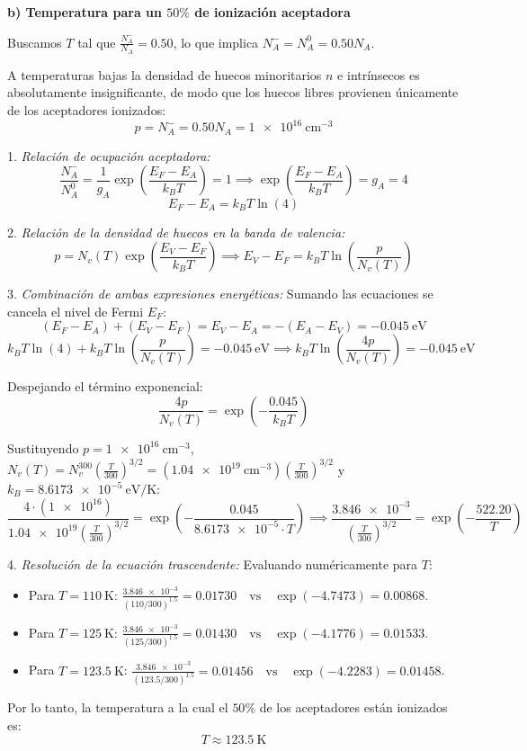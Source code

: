\begin{problema}
\textbf{b) Temperatura para un $50\%$ de ionización aceptadora}

Buscamos $T$ tal que $\frac{N_A^-}{N_A} = 0.50$, lo que implica $N_A^- = N_A^0 = 0.50 N_A$.

A temperaturas bajas la densidad de huecos minoritarios $n$ e intrínsecos es absolutamente insignificante, de modo que los huecos libres provienen únicamente de los aceptadores ionizados:
\[
p = N_A^- = 0.50 N_A = \SI{1e16}{\cm^{-3}}
\]

1. \textit{Relación de ocupación aceptadora:}
\[
\frac{N_A^-}{N_A^0} = \frac{1}{g_A} \exp\left( \frac{E_F - E_A}{k_B T} \right) = 1 \implies \exp\left( \frac{E_F - E_A}{k_B T} \right) = g_A = 4
\]
\[
E_F - E_A = k_B T \ln(4)
\]

2. \textit{Relación de la densidad de huecos en la banda de valencia:}
\[
p = N_v(T) \exp\left( \frac{E_V - E_F}{k_B T} \right) \implies E_V - E_F = k_B T \ln\left( \frac{p}{N_v(T)} \right)
\]

3. \textit{Combinación de ambas expresiones energéticas:}
Sumando las ecuaciones se cancela el nivel de Fermi $E_F$:
\[
(E_F - E_A) + (E_V - E_F) = E_V - E_A = -(E_A - E_V) = -\SI{0.045}{\eV}
\]
\[
k_B T \ln(4) + k_B T \ln\left( \frac{p}{N_v(T)} \right) = -\SI{0.045}{\eV} \implies k_B T \ln\left( \frac{4 p}{N_v(T)} \right) = -\SI{0.045}{\eV}
\]

Despejando el término exponencial:
\[
\frac{4 p}{N_v(T)} = \exp\left( -\frac{0.045}{k_B T} \right)
\]

Sustituyendo $p = \SI{1e16}{\cm^{-3}}$, $N_v(T) = N_v^{300} \left(\frac{T}{300}\right)^{3/2} = (\SI{1.04e19}{\cm^{-3}}) \left(\frac{T}{300}\right)^{3/2}$ y $k_B = \SI{8.6173e-5}{\eV/\kelvin}$:
\[
\frac{4 \cdot (\num{1e16})}{\num{1.04e19} \left( \frac{T}{300} \right)^{3/2}} = \exp\left( -\frac{0.045}{\num{8.6173e-5} \cdot T} \right) \implies \frac{\num{3.846e-3}}{\left( \frac{T}{300} \right)^{3/2}} = \exp\left( -\frac{522.20}{T} \right)
\]

4. \textit{Resolución de la ecuación trascendente:}
Evaluando numéricamente para $T$:
\begin{itemize}
    \item Para $T = \SI{110}{\kelvin}$: $\frac{\num{3.846e-3}}{(110/300)^{1.5}} = \num{0.01730} \quad \text{vs} \quad \exp(-4.7473) = \num{0.00868}$.
    \item Para $T = \SI{125}{\kelvin}$: $\frac{\num{3.846e-3}}{(125/300)^{1.5}} = \num{0.01430} \quad \text{vs} \quad \exp(-4.1776) = \num{0.01533}$.
    \item Para $T = \SI{123.5}{\kelvin}$: $\frac{\num{3.846e-3}}{(123.5/300)^{1.5}} = \num{0.01456} \quad \text{vs} \quad \exp(-4.2283) = \num{0.01458}$.
\end{itemize}

Por lo tanto, la temperatura a la cual el $50\%$ de los aceptadores están ionizados es:
\[
T \approx \SI{123.5}{\kelvin}
\]
\end{problema}

